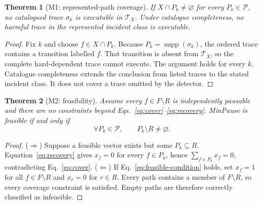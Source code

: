 \documentclass[sn-vancouver,Numbered]{sn-jnl}
\newtheorem{theorem}{Theorem}
\begin{document}
\begin{theorem}[M1: represented-path coverage]
If $X\cap P_k\neq\varnothing$ for every $P_k\in\mathcal P$, no catalogued trace $\sigma_k$ is executable in $\mathcal T_X$. Under catalogue completeness, no harmful trace in the represented incident class is executable.
\end{theorem}
\begin{proof}
Fix $k$ and choose $f\in X\cap P_k$. Because $P_k=\operatorname{supp}(\sigma_k)$, the ordered trace contains a transition labelled $f$. That transition is absent from $\mathcal T_X$, so the complete hard-dependent trace cannot execute. The argument holds for every $k$. Catalogue completeness extends the conclusion from listed traces to the stated incident class. It does not cover a trace omitted by the detector.
\end{proof}

\begin{theorem}[M2: feasibility]
Assume every $f\in F\setminus R$ is independently pausable and there are no constraints beyond Eqs.~\eqref{eq:cover}--\eqref{eq:recovery}. MinPause is feasible if and only if
\begin{equation}
\forall P_k\in\mathcal P,\qquad P_k\setminus R\neq\varnothing.
\label{eq:feasible-condition}
\end{equation}
\end{theorem}
\begin{proof}
($\Rightarrow$) Suppose a feasible vector exists but some $P_k\subseteq R$. Equation~\eqref{eq:recovery} gives $x_f=0$ for every $f\in P_k$, hence $\sum_{f\in P_k}x_f=0$, contradicting Eq.~\eqref{eq:cover}. ($\Leftarrow$) If Eq.~\eqref{eq:feasible-condition} holds, set $x_f=1$ for all $f\in F\setminus R$ and $x_r=0$ for $r\in R$. Every path contains a member of $F\setminus R$, so every coverage constraint is satisfied. Empty paths are therefore correctly classified as infeasible.
\end{proof}
\end{document}
